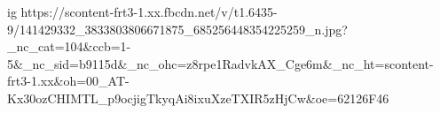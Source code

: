  
 
 
 
 

\ifcmt
  ig https://scontent-frt3-1.xx.fbcdn.net/v/t1.6435-9/141429332_3833803806671875_685256448354225259_n.jpg?_nc_cat=104&ccb=1-5&_nc_sid=b9115d&_nc_ohc=z8rpe1RadvkAX_Cge6m&_nc_ht=scontent-frt3-1.xx&oh=00_AT-Kx30ozCHIMTL_p9ocjigTkyqAi8ixuXzeTXIR5zHjCw&oe=62126F46
\fi
